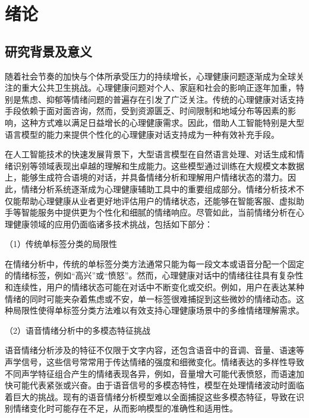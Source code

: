 
\chapter{绪论}

\section{研究背景及意义}

随着社会节奏的加快与个体所承受压力的持续增长，心理健康问题逐渐成为全球关注的重大公共卫生挑战。心理健康问题对个人、家庭和社会的影响正逐年加重，特别是焦虑、抑郁等情绪问题的普遍存在引发了广泛关注\cite{陈_李_2022}。传统的心理健康对话支持手段依赖于面对面咨询，然而，受到资源匮乏、时间限制和地域分布等因素的影响，这种方式难以满足日益增长的心理健康需求。因此，借助人工智能特别是大型语言模型的能力来提供个性化的心理健康对话支持成为一种有效补充手段。

在人工智能技术的快速发展背景下，大型语言模型在自然语言处理、对话生成和情绪识别等领域表现出卓越的理解和生成能力。这些模型通过训练在大规模文本数据上，能够生成符合语境的对话，并具备情绪分析和理解用户情绪状态的潜力\cite{yan_yang_yin_2023}。因此，情绪分析系统逐渐成为心理健康辅助工具中的重要组成部分。情绪分析技术不仅能帮助心理健康从业者更好地评估用户的情绪状态，还能够在智能客服、虚拟助手等智能服务中提供更为个性化和细腻的情绪响应。尽管如此，当前情绪分析在心理健康领域的应用仍面临诸多技术挑战，包括如下部分：

（1）传统单标签分类的局限性

在情绪分析中，传统的单标签分类方法通常只能为每一段文本或语音分配一个固定的情绪标签，例如“高兴”或“愤怒”\cite{Zheng_Liu_Yin_2021}。然而，心理健康对话中的情绪往往具有复杂性和连续性，用户的情绪状态可能在对话中不断变化或交织。例如，用户在表达某种情绪的同时可能夹杂着焦虑或不安，单一标签很难捕捉到这些微妙的情绪动态。这种局限性使得单标签分类方法难以有效支持心理健康场景中的多维情绪理解需求。

（2）语音情绪分析中的多模态特征挑战

语音情绪分析涉及的特征不仅限于文字内容，还包含语音中的音调、音量、语速等声学信号，这些信号常常用于传达情绪的强度和细微变化\cite{罗_冉_杨_豆_2022}。情绪表达的多样性导致不同声学特征组合产生的情绪表现各异，例如，音量增大可能代表愤怒，而语速加快可能代表紧张或兴奋。由于语音信号的多模态特性，模型在处理情绪波动时面临着巨大的挑战。现有的语音情绪分析模型难以全面捕捉这些多模态特征，导致在识别情绪变化时可能存在不足，从而影响模型的准确性和适用性\cite{丁_陈_曾_2023}。

